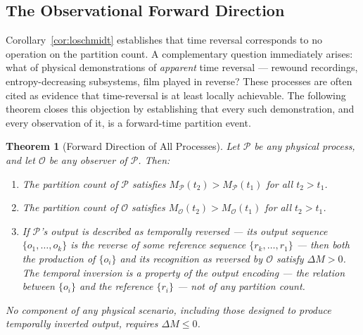 \documentclass[twocolumn,10pt,a4paper]{article}
\theoremstyle{thmstyle}
\newtheorem{theorem}{Theorem}[section]
\theoremstyle{definition}
\theoremstyle{remark}
\begin{document}
\subsection{The Observational Forward Direction}
\label{sec:obs-forward}

Corollary~\ref{cor:loschmidt} establishes that time reversal corresponds to no operation on the partition count. A complementary question immediately arises: what of physical demonstrations of \emph{apparent} time reversal --- rewound recordings, entropy-decreasing subsystems, film played in reverse? These processes are often cited as evidence that time-reversal is at least locally achievable. The following theorem closes this objection by establishing that every such demonstration, and every observation of it, is a forward-time partition event.

\begin{theorem}[Forward Direction of All Processes]
\label{thm:forward-all}
Let $\mathcal{P}$ be any physical process, and let $\mathcal{O}$ be any observer of $\mathcal{P}$. Then:
\begin{enumerate}[leftmargin=1.5em,label=(\roman*),itemsep=0.2em]
\item The partition count of $\mathcal{P}$ satisfies $M_{\mathcal{P}}(t_2) > M_{\mathcal{P}}(t_1)$ for all $t_2 > t_1$.
\item The partition count of $\mathcal{O}$ satisfies $M_{\mathcal{O}}(t_2) > M_{\mathcal{O}}(t_1)$ for all $t_2 > t_1$.
\item If $\mathcal{P}$'s output is described as \emph{temporally reversed} --- its output sequence $\{o_1, \ldots, o_k\}$ is the reverse of some reference sequence $\{r_k, \ldots, r_1\}$ --- then both the production of $\{o_i\}$ and its recognition as reversed by $\mathcal{O}$ satisfy $\Delta M > 0$. The temporal inversion is a property of the \emph{output encoding} --- the relation between $\{o_i\}$ and the reference $\{r_i\}$ --- not of any partition count.
\end{enumerate}
No component of any physical scenario, including those designed to produce temporally inverted output, requires $\Delta M \leq 0$.
\end{theorem}
\end{document}

